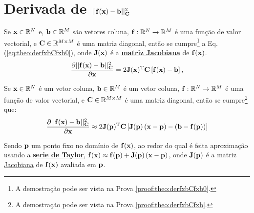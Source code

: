 
\section{Derivada de $||\VECTOR{f}(\VECTOR{x})-\VECTOR{b}||_{\MATRIX{C}}^2$  
}

\begin{theorem}\label{theo:derfxbCfxb0}
Se 
$\VECTOR{x}\in \mathbb{R}^N$ e, 
$\VECTOR{b}\in \mathbb{R}^M$ são vetores coluna,  
$\VECTOR{f}: \mathbb{R}^{N}\rightarrow \mathbb{R}^{M}$ é uma função de valor vectorial, e
$\MATRIX{C} \in \mathbb{R}^{M\times M}$ é uma matriz diagonal, 
então se cumpre\footnote{A demostração pode ser vista na Prova \ref{proof:theo:derfxbCfxb0}.} a Eq. (\ref{eq:theo:derfxbCfxb0}),
onde $\MATRIX{J}(\VECTOR{x})$ é a \hyperref[def:jacobian]{\textbf{matriz Jacobiana}} de $\VECTOR{f}(\VECTOR{x})$.
\begin{equation}\label{eq:theo:derfxbCfxb0}
\frac{\partial ||\VECTOR{f}(\VECTOR{x})-\VECTOR{b}||_{\MATRIX{C}}^2}{\partial \VECTOR{x}} =
2 \MATRIX{J}(\VECTOR{x})^{\transpose}\MATRIX{C}\left[\VECTOR{f}(\VECTOR{x})-\VECTOR{b}\right],
\end{equation}

\end{theorem}

\begin{theorem}\label{theo:derfxbCfxb}
Se 
$\VECTOR{x}\in \mathbb{R}^N$ é um vetor coluna, 
$\VECTOR{b}\in \mathbb{R}^M$ é um vetor coluna,  
$\VECTOR{f}: \mathbb{R}^{N}\rightarrow \mathbb{R}^{M}$ é uma função de valor vectorial, e
$\MATRIX{C} \in \mathbb{R}^{M\times M}$ é uma matriz diagonal, 
então se cumpre\footnote{A demostração pode ser vista na Prova \ref{proof:theo:derfxbCfxb}.} que:
\begin{equation}
\frac{\partial ||\VECTOR{f}(\VECTOR{x})-\VECTOR{b}||_{\MATRIX{C}}^2}{\partial \VECTOR{x}} \approx
2 \MATRIX{J}(\VECTOR{p})^{\transpose}\MATRIX{C}\left[\MATRIX{J}(\VECTOR{p})\left(\VECTOR{x} - \VECTOR{p}\right)-\left(\VECTOR{b}-\VECTOR{f}(\VECTOR{p})\right)\right]
\end{equation}

Sendo $\VECTOR{p}$ um ponto fixo no domínio de $\VECTOR{f}(\VECTOR{x})$,  ao redor do qual é feita  aproximação
usando a \hyperref[def:taylor]{\textbf{serie de Taylor}}, 
$\VECTOR{f}(\VECTOR{x})\approx \VECTOR{f}(\VECTOR{p})+\MATRIX{J}(\VECTOR{p})\left(\VECTOR{x}-\VECTOR{p}\right)$,
onde $\MATRIX{J}(\VECTOR{p})$ é a matriz \hyperref[def:jacobian]{Jacobiana} de $\VECTOR{f}(\VECTOR{x})$ avaliada em $\VECTOR{p}$.

\end{theorem}


